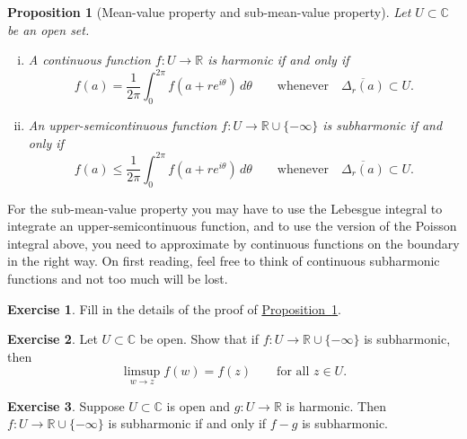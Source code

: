 \documentclass[12pt,openany]{book}
\newcommand{\C}{{\mathbb{C}}}
\newcommand{\R}{{\mathbb{R}}}
\theoremstyle{plain}
\newtheorem{prop}[thm]{Proposition}
\theoremstyle{remark}
\theoremstyle{definition}
\newenvironment{exbox}{%
    \def\FrameCommand{\vrule width 1pt \relax\hspace{10pt}}%
    \MakeFramed{\advance\hsize-\width\FrameRestore}%
}{%
    \endMakeFramed
}
\theoremstyle{exercise}
\newtheorem{exercise}{Exercise}[section]
\theoremstyle{example}
\newcommand{\propref}[1]{\hyperref[#1]{Proposition~\ref*{#1}}}
\begin{document}
\begin{prop}[Mean-value property and sub-mean-value property]
\pagebreak[2]%
\label{prop:meansubmeanprop}%
%
%
Let $U \subset \C$ be an open set.
\begin{enumerate}[(i)]
\item
A continuous function
$f \colon U \to \R$
is harmonic if and only if 
\begin{equation*}
f(a) = \frac{1}{2\pi} \int_0^{2\pi} f(a+re^{i\theta})\, d\theta
\qquad \text{whenever} \quad
\overline{\Delta_r(a)} \subset U .
\end{equation*}
\item
An upper-semicontinuous function $f \colon U \to \R \cup \{ -\infty \}$
is subharmonic if and only if
\begin{equation*}
f(a) \leq \frac{1}{2\pi} \int_0^{2\pi} f(a+re^{i\theta})\, d\theta
\qquad \text{whenever} \quad
\overline{\Delta_r(a)} \subset U .
\end{equation*}
\end{enumerate}
\end{prop}

For the sub-mean-value property you may have to use 
the Lebesgue integral to integrate an upper-semicontinuous function,
and to use the version of the Poisson integral above, you need to
approximate by continuous functions on the boundary in the right way.
On first reading, feel free to think of continuous subharmonic
functions and not too much will be lost.

\begin{exbox}
\begin{exercise}
Fill in the details of the proof of \propref{prop:meansubmeanprop}.
\end{exercise}

\begin{exercise}
Let $U \subset \C$ be open.
Show that if $f \colon U \to \R \cup\{- \infty \}$ is subharmonic,
then 
\begin{equation*}
\limsup_{w \to z} f(w) = f(z) 
\qquad \text{for all $z \in U$.}
\end{equation*}
\end{exercise}

\begin{exercise} \label{exercise:fminusgsubharmonic}
Suppose $U \subset \C$ is open and $g \colon U \to \R$ is harmonic.
Then $f \colon U \to \R \cup \{ -\infty \}$ is subharmonic if and only if $f-g$
is subharmonic.
\end{exercise}
\end{exbox}
\end{document}
